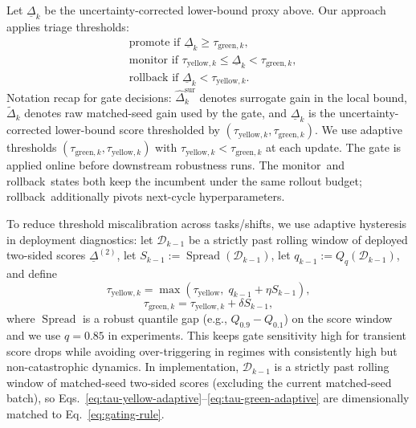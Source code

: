 \documentclass[letterpaper,10pt,conference]{ieeeconf}
\newcommand{\CoreGateMonitor}{monitor}
\newcommand{\CoreGateRollback}{rollback}
\begin{document}
Let $\underline{\Delta}_k$ be the uncertainty-corrected lower-bound proxy above. Our approach applies triage thresholds:
\begin{equation}
\begin{aligned}
&\text{promote if } \underline{\Delta}_k \ge \tau_{\text{green},k},\\
&\text{monitor if } \tau_{\text{yellow},k} \le \underline{\Delta}_k < \tau_{\text{green},k},\\
&\text{rollback if } \underline{\Delta}_k < \tau_{\text{yellow},k}.
\end{aligned}
\label{eq:gating-rule}
\end{equation}
Notation recap for gate decisions: $\hat{\Delta}_k^{\mathrm{sur}}$ denotes surrogate gain in the local bound, $\tilde{\Delta}_k$ denotes raw matched-seed gain used by the gate, and $\underline{\Delta}_k$ is the uncertainty-corrected lower-bound score thresholded by $(\tau_{\text{yellow},k},\tau_{\text{green},k})$.
We use adaptive thresholds $(\tau_{\text{green},k},\tau_{\text{yellow},k})$ with $\tau_{\text{yellow},k}<\tau_{\text{green},k}$ at each update. The gate is applied online before downstream robustness runs. The \CoreGateMonitor\ and \CoreGateRollback\ states both keep the incumbent under the same rollout budget; \CoreGateRollback\ additionally pivots next-cycle hyperparameters.

To reduce threshold miscalibration across tasks/shifts, we use adaptive hysteresis in deployment diagnostics: let $\mathcal{D}_{k-1}$ be a strictly past rolling window of deployed two-sided scores $\underline{\Delta}^{(2)}$, let $S_{k-1}:=\operatorname{Spread}(\mathcal{D}_{k-1})$, let $q_{k-1}:=Q_q(\mathcal{D}_{k-1})$, and define
\begin{equation}
\tau_{\text{yellow},k}
=\max\!\left(\tau_{\text{yellow}},\;q_{k-1}+\eta S_{k-1}\right),
\label{eq:tau-yellow-adaptive}
\end{equation}
\begin{equation}
\tau_{\text{green},k}
=
\tau_{\text{yellow},k}+\delta S_{k-1},
\label{eq:tau-green-adaptive}
\end{equation}
where $\operatorname{Spread}$ is a robust quantile gap (e.g., $Q_{0.9}-Q_{0.1}$) on the score window and we use $q=0.85$ in experiments. This keeps gate sensitivity high for transient score drops while avoiding over-triggering in regimes with consistently high but non-catastrophic dynamics.
In implementation, $\mathcal{D}_{k-1}$ is a strictly past rolling window of matched-seed two-sided scores (excluding the current matched-seed batch), so Eqs.~\ref{eq:tau-yellow-adaptive}--\ref{eq:tau-green-adaptive} are dimensionally matched to Eq.~\ref{eq:gating-rule}.
\end{document}
